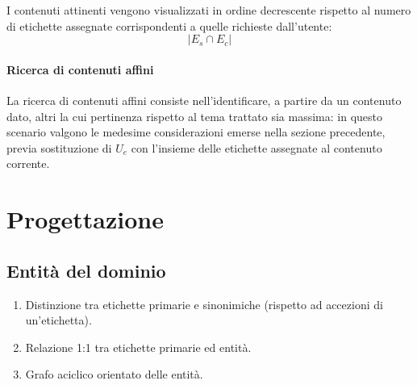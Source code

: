\documentclass[10pt,a4paper,headinclude,footinclude,hidelinks]{scrreprt} %
\begin{document}
	I contenuti attinenti vengono visualizzati in ordine decrescente rispetto al numero di etichette assegnate corrispondenti a quelle richieste dall'utente:
	$$\left|{E_s \cap E_c}\right|$$

	\subsubsection{Ricerca di contenuti affini}
	La ricerca di contenuti affini consiste nell'identificare, a partire da un contenuto dato, altri la cui pertinenza rispetto al tema trattato sia massima: in questo scenario valgono le medesime considerazioni emerse nella sezione precedente, previa sostituzione di $U_e$ con l'insieme delle etichette assegnate al contenuto corrente.

	\chapter{Progettazione}
	\section{Entit\`a del dominio}
	\begin{enumerate}
	\item Distinzione tra etichette primarie e sinonimiche (rispetto ad accezioni di un'etichetta).
	\item Relazione 1:1 tra etichette primarie ed entità.
	\item Grafo aciclico orientato delle entità.
	\end{enumerate}
\end{document}
